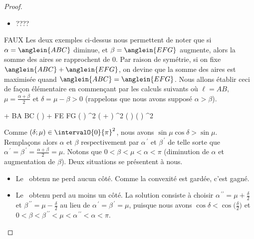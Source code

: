 \begin{proof}
\begin{itemize}
		\item ????
	\end{itemize}


	FAUX 
	Les deux exemples ci-dessus nous permettent de noter que si $\alpha = \anglein{ABC}$ diminue, et $\beta = \anglein{EFG}$ augmente, alors la somme des aires se rapprochent de $0$.
	Par raison de symétrie, si on fixe $\anglein{ABC} + \anglein{EFG}$, on devine que la somme des aires est maximisée quand $\anglein{ABC} = \anglein{EFG}$.
	Nous allons établir ceci de façon élémentaire en commençant par les calculs suivants où
	$\ell = AB$,
	$\mu = \frac{\alpha + \beta}{2}$ et
	$\delta = \mu - \beta > 0$ (rappelons que nous avons supposé $\alpha > \beta$).

	\medskip
	\begin{stepcalc}[style=ar*]
		 + 
		 BA \cdot BC \cdot \sin \big(  \big)
		+
		 FE \cdot FG \cdot \sin \big(  \big)
	\explnext{}
		 \ell^2 ( \sin \alpha + \sin \beta )
		 \ell^2 \sin \big(  \big) \cos \big(  \big)
	\explnext{}
		 \ell^2 \sin \mu \cos \delta
	\end{stepcalc}


	\medskip

	Comme $(\delta ; \mu) \in \intervalO{0}{\pi}^2$,
	nous avons $\sin \mu \cos \delta > \sin \mu$.
	Remplaçons alors $\alpha$ et $\beta$ respectivement par $\alpha^{\,\prime}$ et $\beta^{\,\prime}$ de telle sorte que $\alpha^{\,\prime} = \beta^{\,\prime} = \frac{\alpha + \beta}{2} = \mu$.
	Notons que
	$0 < \beta < \mu < \alpha < \pi$
	(diminution de $\alpha$ et augmentation de $\beta$).
	Deux situations se présentent à nous.
	\begin{itemize}
		\item Le \ngone\ obtenu ne perd aucun côté.
		Comme la convexité est gardée, c'est gagné.

		\item Le \ngone\ obtenu perd au moins un côté. La solution consiste à choisir
		$\alpha^{\,\prime\prime} = \mu + \frac{\delta}{2}$ et $\beta^{\,\prime\prime} = \mu - \frac{\delta}{2}$
		au lieu de
		$\alpha^{\,\prime} = \beta^{\,\prime} = \mu$, puisque nous avons
		$\cos \delta < \cos \big( \frac{\delta}{2} \big)$ et
		$0 < \beta < \beta^{\,\prime\prime} < \mu < \alpha^{\,\prime\prime} < \alpha < \pi$.
	\end{itemize}
\end{proof}


